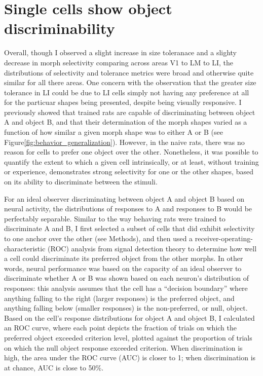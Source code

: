 \section{Single cells show object discriminability}
% 
Overall, though I observed a slight increase in size toleranace and a slighty decrease in morph selectivity comparing across areas V1 to LM to LI, the distributions of selectivity and tolerance metrics were broad and otherwise quite similar for all there areas. One concern with the observation that the greater size tolerance in LI could be due to LI cells simply not having any preference at all for the particuar shapes being presented, despite being visually responsive.  
I previously showed that trained rats are capable of discriminating between object A and object B, and that their determination of the morph shapes varied as a function of how similar a given morph shape was to either A or B (see Figure\ref{fig:behavior_generalization}). However, in the naive rats, there was no reason for cells to prefer one object over the other. Nonetheless, it was possible to quantify the extent to which a given cell intrinsically, or at least, without training or experience, demonstrates strong selectivity for one or the other shapes, based on its ability to discriminate between the stimuli.

For an ideal observer discriminating between object A and object B based on neural activity, the distributions of responses to A and responses to B would be perfectably separable. Similar to the way behaving rats were trained to discriminate A and B, I first selected a subset of cells that did exhibit selectivity to one anchor over the other (see Methods), and then used a receiver-operating-characteristic (ROC) analysis from signal detection theory to determine how well a cell could discriminate its preferred object from the other morphs\cite{Green1966, Britten1992, Busse2011}. In other words, neural performance was based on the capacity of an ideal observer to discriminate whether A or B was shown based on each neuron's distribution of responses:  this analysis assumes that the cell has a ``decision boundary'' where anything falling to the right (larger responses) is the preferred object, and anything falling below (smaller responses) is the non-preferred, or null, object. Based on the cell's response distributions for object A and object B, I calculated an ROC curve, where each point depicts the fraction of trials on which the preferred object exceeded criterion level, plotted against the proportion of trials on which the null object response exceeded criterion. When discrimination is high, the area under the ROC curve (AUC) is closer to 1; when discrimination is at chance, AUC is close to 50\%. 

